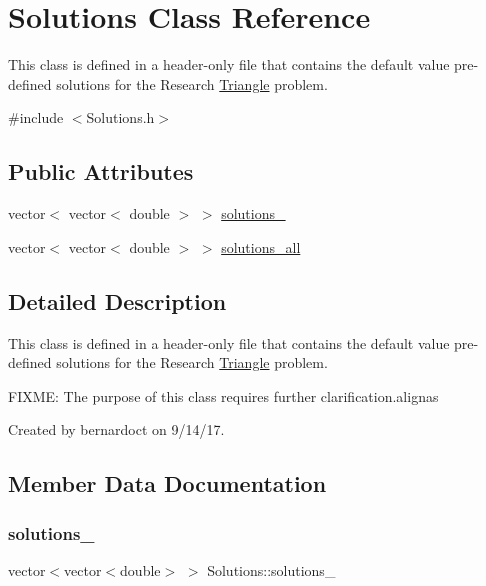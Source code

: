 \hypertarget{classSolutions}{}\section{Solutions Class Reference}
\label{classSolutions}


This class is defined in a header-\/only file that contains the default value pre-\/defined solutions for the Research \mbox{\hyperlink{classTriangle}{Triangle}} problem.  




{\ttfamily \#include $<$Solutions.\+h$>$}

\subsection*{Public Attributes}
\begin{DoxyCompactItemize}
\item 
vector$<$ vector$<$ double $>$ $>$ \mbox{\hyperlink{classSolutions_a719624b0ddd892bf180206d9d4338cd2}{solutions\+\_}}
\item 
vector$<$ vector$<$ double $>$ $>$ \mbox{\hyperlink{classSolutions_a1d52637d01c7e17fcc05a918375a7728}{solutions\+\_\+all}}
\end{DoxyCompactItemize}


\subsection{Detailed Description}
This class is defined in a header-\/only file that contains the default value pre-\/defined solutions for the Research \mbox{\hyperlink{classTriangle}{Triangle}} problem. 

F\+I\+X\+ME\+: The purpose of this class requires further clarification.\+alignas

Created by bernardoct on 9/14/17. 

\subsection{Member Data Documentation}
\mbox{\label{classSolutions_a719624b0ddd892bf180206d9d4338cd2}} 
\subsubsection{\texorpdfstring{solutions\+\_}{solutions\_16}}
{\footnotesize\ttfamily vector$<$vector$<$double$>$ $>$ Solutions\+::solutions\+\_}

